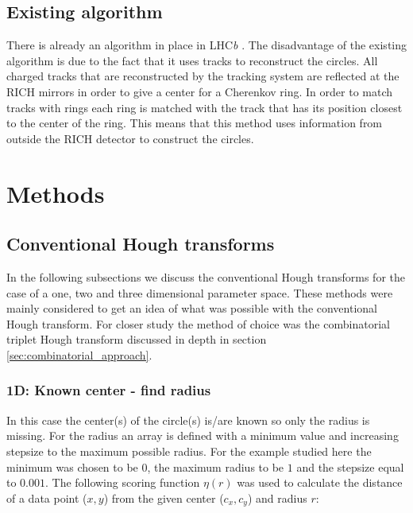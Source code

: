 \documentclass[11pt,twoside]{scrreprt}
\begin{document}
\section{Existing algorithm} %
\label{sub:existing_algorithm}
There is already an algorithm in place in LHC\textit{b} \cite{Forty1999}. The disadvantage of the existing algorithm is due to the 
fact that it uses tracks to reconstruct the circles. All charged tracks that are reconstructed by the tracking system are reflected at
the RICH mirrors in order to give a center for a Cherenkov ring. In order to match tracks with rings each ring is matched with the track 
that has its position closest to the center of the ring. This means that this method uses information from outside the RICH detector 
to construct the circles.


\chapter{Methods}

\section{Conventional Hough transforms} %
\label{sec:conventional_hough_transforms}

In the following subsections we discuss the conventional Hough transforms for the case of a one, two and three dimensional parameter space. 
These methods were mainly considered to get an idea of what was possible with the conventional Hough transform. For closer study the 
method of choice was the combinatorial triplet Hough transform discussed in depth in section \ref{sec:combinatorial_approach}.

\subsection{1D: Known center - find radius} %
\label{sub:1d_known_center_find_radius}

In this case the center(s) of the circle(s) is/are known so only the radius is missing. For the radius an array is defined with a 
minimum value and increasing stepsize to the maximum possible radius. For the example studied here the minimum was chosen to be $0$, 
the maximum radius to be $1$ and the stepsize equal to $0.001$. The following scoring function $\eta(r)$ was used to calculate the distance
of a data point ($x,y$) from the given center ($c_x, c_y$) and radius $r$:
\end{document}
